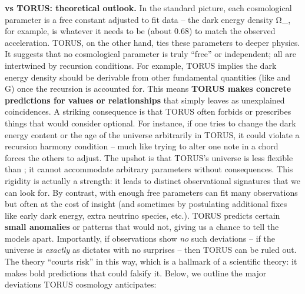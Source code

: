 \documentclass[
]{article}
\begin{document}
{\textbf{\LambdaCDM vs TORUS: theoretical outlook.} In the standard picture,
each cosmological parameter is a free constant adjusted to fit data --
the dark energy density
Ω_{\Lambda}, for example, is
whatever it needs to be (about 0.68) to match the observed acceleration.
TORUS, on the other hand, ties these parameters to deeper physics. It
suggests that no cosmological parameter is truly ``free'' or
independent; all are intertwined by recursion conditions. For example,
TORUS implies the dark energy density should be derivable from other
fundamental quantities (like \alpha and G) once the recursion is accounted
for\hspace{0pt}. This means \textbf{TORUS makes concrete predictions for
values or relationships} that \LambdaCDM simply leaves as unexplained
coincidences. A striking consequence is that TORUS often forbids or
prescribes things that \LambdaCDM would consider optional. For instance, if
one tries to change the dark energy content or the age of the universe
arbitrarily in TORUS, it could violate a recursion harmony condition --
much like trying to alter one note in a chord forces the others to
adjust. The upshot is that TORUS's universe is less flexible than \LambdaCDM;
it cannot accommodate arbitrary parameters without consequences. This
rigidity is actually a strength: it leads to distinct observational
signatures that we can look for. By contrast, \LambdaCDM with enough free
parameters can fit many observations but often at the cost of insight
(and sometimes by postulating additional fixes like early dark energy,
extra neutrino species, etc.). TORUS predicts certain \textbf{small
anomalies} or patterns that \LambdaCDM would not, giving us a chance to tell
the models apart. Importantly, if observations show \emph{no} such
deviations -- if the universe is \emph{exactly} as \LambdaCDM dictates with no
surprises -- then TORUS can be ruled out. The theory ``courts risk'' in
this way\hspace{0pt}, which is a hallmark of a scientific theory: it
makes bold predictions that could falsify it. Below, we outline the
major deviations TORUS cosmology anticipates:

}
\end{document}
